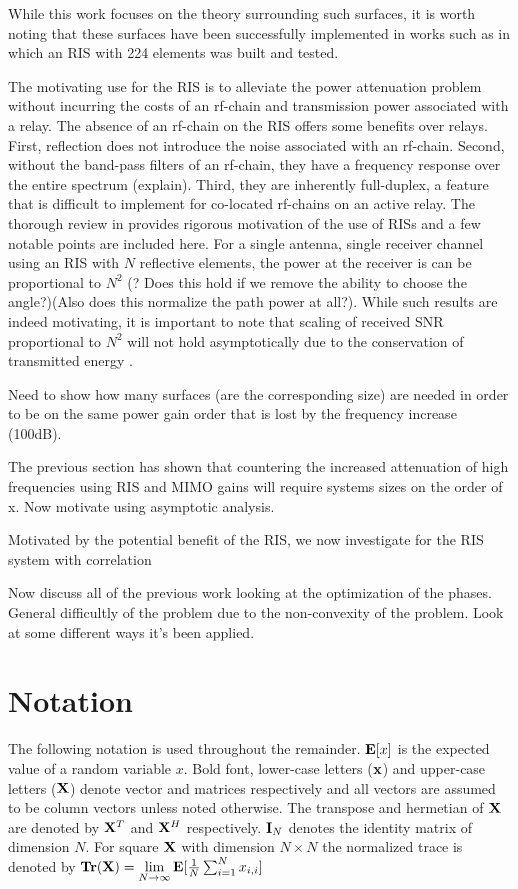\documentclass[12pt,a4paper]{report}
\begin{document}
While this work focuses on the theory surrounding such surfaces, it is worth noting that these surfaces have been successfully implemented in works such as \cite{tan2018enabling} in which an RIS with 224 elements was built and tested. 
\par
The motivating use for the RIS is to alleviate the power attenuation problem without incurring the costs of an rf-chain and transmission power 
associated with a relay. The absence of an rf-chain on the RIS offers some benefits over relays. First, reflection does not introduce the noise associated with an rf-chain. Second, without the band-pass filters of an rf-chain, they have a frequency response over the entire spectrum (explain). Third, they are inherently full-duplex, a feature that is difficult to implement for co-located rf-chains on an active relay. 
The thorough review in \cite{basar2019wireless} provides rigorous motivation of the use of RISs and a few notable points are included here.
For a single antenna, single receiver channel using an RIS with $N$ reflective elements, the power at the receiver is can be proportional to $N^2$ (? Does this hold if we remove the ability to choose the angle?)(Also does this normalize the path power at all?). While such results are indeed motivating, it is important to note that scaling of received SNR proportional to $N^2$ will not hold asymptotically due to the conservation of transmitted energy \cite{bjornson2019demystifying}.
\par
Need to show how many surfaces (are the corresponding size) are needed in order to be on the same power gain order that is lost by the frequency increase (100dB).
\par
The previous section has shown that countering the increased attenuation of high frequencies using RIS and MIMO gains will require systems 
sizes on the order of x. Now motivate using asymptotic analysis.
\par

\par
Motivated by the potential benefit of the RIS, we now investigate for the RIS system with correlation

\par
Now discuss all of the previous work looking at the optimization of the phases. 
General difficultly of the problem due to the non-convexity of the problem. Look at some different ways it's been applied.

\section{Notation}
The following notation is used throughout the remainder. 
$\mathop{\bf E{}}[x]$ is the expected value of a random variable $x$.
Bold font, lower-case letters ($\mathbf{x}$) and upper-case letters ($\mathbf{X}$) denote vector and matrices respectively and all vectors are assumed to be column vectors unless noted otherwise. 
The transpose and hermetian of $\mathbf{X}$ are denoted by $\mathbf{X}^T$ and $\mathbf{X}^H$ respectively.
$\mathbf{I}_N$ denotes the identity matrix of dimension $N$.
For square $\mathbf{X}$ with dimension $N\times N$ the normalized trace is denoted by $\mathop{\bf Tr}(\mathbf{X})  = \underset{N \rightarrow \infty}{\text{lim}}
\mathop{\bf E{}}[\frac{1}{N}\sum_{i=1}^N x_{i,i}]$
\end{document}
